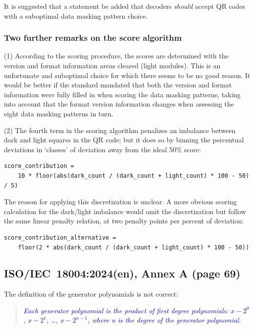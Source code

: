 \documentclass[a4paper,twoside]{article}
\newcommand{\shortstandard}{ISO/IEC~18004}
\newcommand{\standard}{\shortstandard:2024(en)}
\newcommand{\quotestandard}[1]{\textcolor{blue}{\textit{#1}}}
\begin{document}
It is suggested that a statement be added that decoders \emph{should} accept QR codes with a suboptimal data masking
pattern choice.

\subsubsection*{Two further remarks on the score algorithm}

(1) According to the scoring procedure, the scores are determined with the version and format information areas
cleared (light modules). This is an unfortunate and suboptimal choice for which there seems to be no good reason.
It would be better if the standard mandated that both the version and format information were fully filled in when 
scoring the data masking patterns, taking into account that the format version information changes when assessing
the eight data masking patterns in turn.

(2) The fourth term in the scoring algorithm penalizes an imbalance between dark and light
squares in the QR code; but it does so by binning the percentual deviations in `classes' of
deviation away from the ideal 50\% score:

\begin{verbatim}
score_contribution =
    10 * floor(abs(dark_count / (dark_count + light_count) * 100 - 50) / 5)
\end{verbatim}

The reason for applying this discretization is unclear. A more obvious scoring calculation for the
dark/light imbalance would omit the discretization but follow the same linear penalty relation,
at two penalty points per percent of deviation:

\begin{verbatim}
score_contribution_alternative =
    floor(2 * abs(dark_count / (dark_count + light_count) * 100 - 50))
\end{verbatim}

\subsection{\standard, Annex A (page 69)}

The definition of the generator polynomials is not correct:

\begin{quote}
\quotestandard{Each generator polynomial is the product of first degree polynomials: $x - 2^0$, $x - 2^1$, \dots, $x - 2^{n-1}$,
where n is the degree of the generator polynomial.}
\end{quote}
\end{document}
